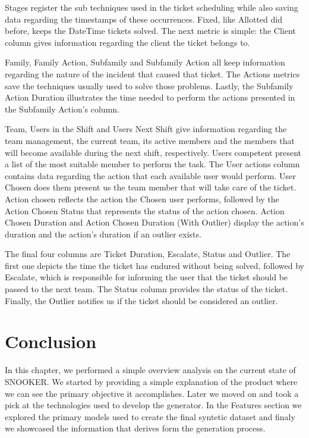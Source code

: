 Stages register the sub techniques used in the ticket scheduling while also saving data regarding the timestamps of these occurrences. Fixed, like Allotted did before, keeps the DateTime tickets solved. The next metric is simple: the Client column gives information regarding the client the ticket belongs to.

Family, Family Action, Subfamily and Subfamily Action all keep information regarding the nature of the incident that caused that ticket. The Actions metrics save the techniques usually used to solve those problems. Lastly, the Subfamily Action Duration illustrates the time needed to perform the actions presented in the Subfamily Action's column.

Team, Users in the Shift and Users Next Shift give information regarding the team management, the current team, its active members and the members that will become available during the next shift, respectively. Users competent present a list of the most suitable member to perform the task. The User actions column contains data regarding the action that each available user would perform. User Chosen does them present us the team member that will take care of the ticket. Action chosen reflects the action the Chosen user performs, followed by the Action Chosen Status that represents the status of the action chosen. Action Chosen Duration and Action Chosen Duration (With Outlier) display the action's duration and the action's duration if an outlier exists.

The final four columns are Ticket Duration, Escalate, Status and Outlier. The first one depicts the time the ticket has endured without being solved, followed by Escalate, which is responsible for informing the user that the ticket should be passed to the next team. The Status column provides the status of the ticket. Finally, the Outlier notifies us if the ticket should be considered an outlier.


\section{Conclusion}
In this chapter, we performed a simple overview analysis on the current state of SNOOKER. We started by providing a simple explanation of the product where we can see the primary objective it accomplishes. Later we moved on and took a pick at the technologies used to develop the generator. In the Features section we explored the primary models used to create the final syntetic dataset and finaly we showcased the information that derives form the generation process. 